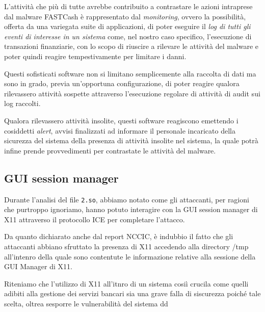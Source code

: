 \documentclass[10pt,a4paper, titlepage]{report}
\begin{document}
L'attività che più di tutte avrebbe contribuito a contrastare le azioni intraprese dal malware FASTCash è rappresentato dal \textit{monitoring}, ovvero la possibilità, offerta da una variegata suite di applicazioni, di poter eseguire il \textit{log di tutti gli eventi di interesse in un sistema} come, nel nostro caso specifico, l'esecuzione di transazioni finanziarie, con lo scopo di riuscire a rilevare le attività del malware e poter quindi reagire tempestivamente per limitare i danni.

Questi sofisticati software non si limitano semplicemente alla raccolta di dati ma sono in grado, previa un'opportuna configurazione, di poter reagire qualora rilevassero attività sospette attraverso l'esecuzione regolare di attività di audit sui log raccolti. 

Qualora rilevassero attività insolite, questi software reagiscono emettendo i cosiddetti \textit{alert}, avvisi finalizzati ad informare il personale incaricato della sicurezza del sistema della presenza di attività insolite nel sistema, la quale potrà infine prende provvedimenti per contrastate le attività del malware.  

\subsection{GUI session manager}

Durante l'analisi del file \texttt{2.so}, abbiamo notato come gli attaccanti, per ragioni che purtroppo ignoriamo, hanno potuto interagire con la GUI session manager di X11 attraverso il protocollo ICE per completare l'attacco.

Da quanto dichiarato anche dal report NCCIC, è indubbio il fatto che gli attaccanti abbiano sfruttato la presenza di X11 accedendo alla directory /tmp all'intenro della quale sono contentute le informazione relative alla sessione della GUI Manager di X11.

Riteniamo che l'utilizzo di X11 all'itnro di un sistema cosiì crucila come quelli adibiti alla gestione dei servizi bancari sia una grave falla di siscurezza poiché tale scelta, oltrea sesporre le vulnerabilità del sistema dd
\end{document}
